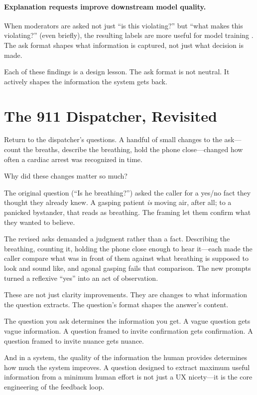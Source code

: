 \paragraph{Explanation requests improve downstream model quality.} When moderators are asked not just ``is this violating?'' but ``what makes this violating?'' (even briefly), the resulting labels are more useful for model training \autocite{zaidan2007rationales}. The ask format shapes what information is captured, not just what decision is made.

Each of these findings is a design lesson. The ask format is not neutral. It actively shapes the information the system gets back.

\section{The 911 Dispatcher, Revisited}
\label{sec:ch05-dispatcher-revisited}

Return to the dispatcher's questions. A handful of small changes to the ask---count the breaths, describe the breathing, hold the phone close---changed how often a cardiac arrest was recognized in time.

Why did these changes matter so much?

The original question (``Is he breathing?'') asked the caller for a yes/no fact they thought they already knew. A gasping patient \emph{is} moving air, after all; to a panicked bystander, that reads as breathing. The framing let them confirm what they wanted to believe.

The revised asks demanded a judgment rather than a fact. Describing the breathing, counting it, holding the phone close enough to hear it---each made the caller compare what was in front of them against what breathing is supposed to look and sound like, and agonal gasping fails that comparison. The new prompts turned a reflexive ``yes'' into an act of observation.

These are not just clarity improvements. They are changes to what information the question extracts. The question's format shapes the answer's content.

\begin{keyconcept}
The question you ask determines the information you get. A vague question gets vague information. A question framed to invite confirmation gets confirmation. A question framed to invite nuance gets nuance.

And in a \hitl system, the quality of the information the human provides determines how much the system improves. A question designed to extract maximum useful information from a minimum human effort is not just a UX nicety---it is the core engineering of the feedback loop.
\end{keyconcept}

